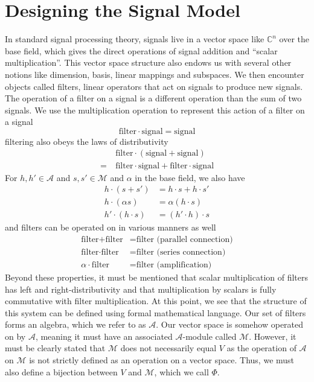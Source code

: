 \documentclass[12pt,technote]{IEEEtran}
\begin{document}
\section{Designing the Signal Model}
In standard signal processing theory, signals live in a vector space like $\mathbb{C}^n$ over the base field, which gives the direct operations of signal addition and ``scalar multiplication''. This vector space structure also endows us with several other notions like dimension, basis, linear mappings and subspaces. We then encounter objects called filters, linear operators that act on signals to produce new signals. The operation of a filter on a signal is a different operation than the sum of two signals. We use the multiplication operation to represent this action of a filter on a signal
\begin{equation*}
    \text{filter}\cdot\text{signal} = \text{signal}
\end{equation*}
filtering also obeys the laws of distributivity
\begin{align*}
    &\text{filter}\cdot (\text{signal} + \text{signal}) \\
    =\ &\text{filter}\cdot \text{signal} + \text{filter}\cdot\text{signal}
\end{align*}
For $h,h'\in \mathcal{A}$ and $s,s'\in\mathcal{M}$ and $\alpha$ in the base field, we also have
\begin{align*}
    h\cdot (s + s') &= h\cdot s + h\cdot s'\\
    h\cdot (\alpha s) &= \alpha (h\cdot s)\\
    h'\cdot (h\cdot s) &= (h'\cdot h)\cdot s
\end{align*}
and filters can be operated on in various manners as well
\begin{align*}
    \text{filter} + \text{filter} &= \text{filter (parallel connection)}\\
    \text{filter} \cdot \text{filter} &= \text{filter (series connection)}\\
    \alpha\cdot\text{filter} &= \text{filter (amplification)}
\end{align*}
Beyond these properties, it must be mentioned that scalar multiplication of filters has left and right-distributivity and that multiplication by scalars is fully commutative with filter multiplication.
At this point, we see that the structure of this system can be defined using formal mathematical language. Our set of filters forms an algebra, which we refer to as $\mathcal{A}$. Our vector space is somehow operated on by $\mathcal{A}$, meaning it must have an associated $\mathcal{A}$-module called $\mathcal{M}$. However, it must be clearly stated that $\mathcal{M}$ does not necessarily equal $V$ as the operation of $\mathcal{A}$ on $\mathcal{M}$ is not strictly defined as an operation on a vector space. Thus, we must also define a bijection between $V$ and $\mathcal{M}$, which we call $\Phi$.
\end{document}
